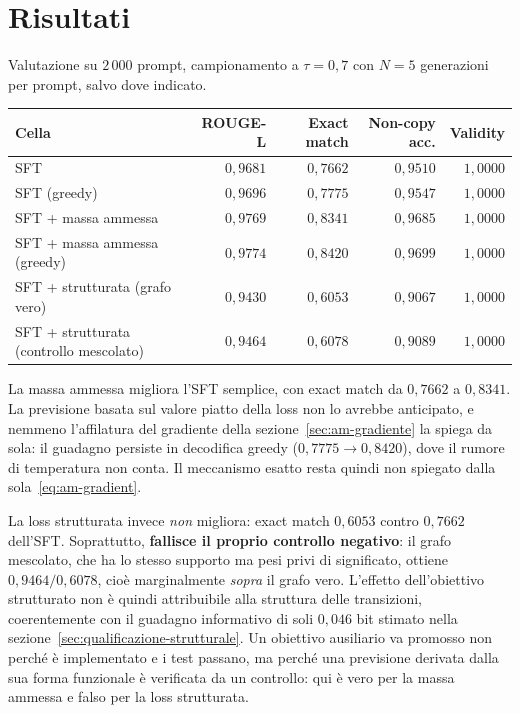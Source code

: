 \section{Risultati}
\label{sec:risultati-ausiliari}

Valutazione su $2\,000$ prompt, campionamento a $\tau=0{,}7$ con $N=5$
generazioni per prompt, salvo dove indicato.

\begin{center}
\begin{tabular}{lrrrr}
\toprule
Cella & ROUGE-L & Exact match & Non-copy acc. & Validity \\
\midrule
SFT & $0{,}9681$ & $0{,}7662$ & $0{,}9510$ & $1{,}0000$ \\
SFT (greedy) & $0{,}9696$ & $0{,}7775$ & $0{,}9547$ & $1{,}0000$ \\
SFT + massa ammessa & $0{,}9769$ & $0{,}8341$ & $0{,}9685$ & $1{,}0000$ \\
SFT + massa ammessa (greedy) & $0{,}9774$ & $0{,}8420$ & $0{,}9699$ & $1{,}0000$ \\
SFT + strutturata (grafo vero) & $0{,}9430$ & $0{,}6053$ & $0{,}9067$ & $1{,}0000$ \\
SFT + strutturata (controllo mescolato) & $0{,}9464$ & $0{,}6078$ & $0{,}9089$ & $1{,}0000$ \\
\bottomrule
\end{tabular}
\end{center}

La massa ammessa migliora l'SFT semplice, con exact match da $0{,}7662$ a
$0{,}8341$. La previsione basata sul valore piatto della loss non lo avrebbe
anticipato, e nemmeno l'affilatura del gradiente della sezione~\ref{sec:am-gradiente}
la spiega da sola: il guadagno persiste in decodifica greedy ($0{,}7775 \to
0{,}8420$), dove il rumore di temperatura non conta. Il meccanismo esatto
resta quindi non spiegato dalla sola~\eqref{eq:am-gradient}.

La loss strutturata invece \emph{non} migliora: exact match $0{,}6053$ contro
$0{,}7662$ dell'SFT. Soprattutto, \textbf{fallisce il proprio controllo
negativo}: il grafo mescolato, che ha lo stesso supporto ma pesi privi di
significato, ottiene $0{,}9464/0{,}6078$, cioè marginalmente \emph{sopra} il
grafo vero. L'effetto dell'obiettivo strutturato non è quindi attribuibile alla
struttura delle transizioni, coerentemente con il guadagno informativo di soli
$0{,}046$ bit stimato nella sezione~\ref{sec:qualificazione-strutturale}. Un
obiettivo ausiliario va promosso non perché è implementato e i test passano, ma
perché una previsione derivata dalla sua forma funzionale è verificata da un
controllo: qui è vero per la massa ammessa e falso per la loss strutturata.
